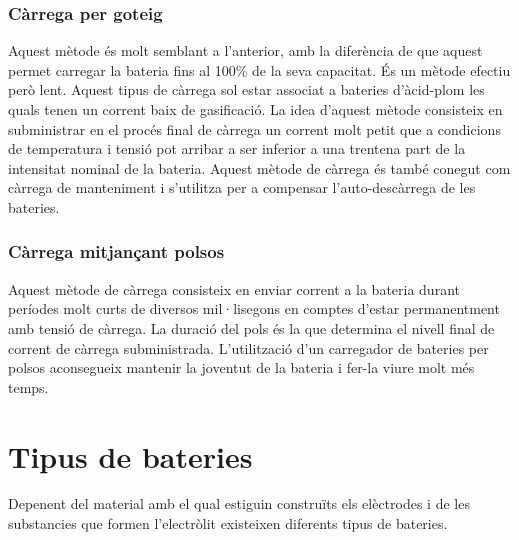 \subsubsection{Càrrega per goteig}
Aquest mètode és molt semblant a l'anterior, amb la diferència de que aquest permet carregar la bateria fins al 100\% de la seva capacitat. És un mètode efectiu però lent. Aquest tipus de càrrega sol estar associat a bateries d'àcid-plom les quals tenen un corrent baix de gasificació. La idea d'aquest mètode consisteix en subministrar en el procés final de càrrega un corrent molt petit que a condicions de temperatura i tensió pot arribar a ser inferior a una trentena part de la intensitat nominal de la bateria. Aquest mètode de càrrega és també conegut com càrrega de manteniment i s'utilitza per a compensar l'auto-descàrrega de les bateries. 

\subsubsection{Càrrega mitjançant polsos}
Aquest mètode de càrrega consisteix en enviar corrent a la bateria durant períodes molt curts de diversos mil·lisegons en comptes d'estar permanentment amb tensió de càrrega. La duració del pols és la que determina el nivell final de corrent de càrrega subministrada. L'utilització d'un carregador de bateries per polsos aconsegueix mantenir la joventut de la bateria i fer-la viure molt més temps.

\section{Tipus de bateries}
Depenent del material amb el qual estiguin construïts els elèctrodes i de les substancies que formen l’electròlit existeixen diferents tipus de bateries. 

